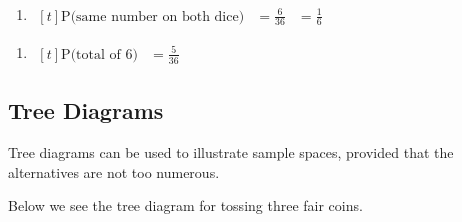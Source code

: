 \documentclass[11pt,a4paper]{book}
\begin{document}
\begin{example}
\begin{minipage}[t]{.6\textwidth}
\begin{enumerate}[label=(\alph*)]
\item
$
\begin{aligned}[t]
\text{P(same number on both dice)} & =\frac{6}{36} & =\frac{1}{6}
\end{aligned}
$
\end{enumerate}

\end{minipage}
\begin{minipage}[t]{.5\textwidth}

\begin{enumerate}[label=(\alph*),start=2]
\item
$
\begin{aligned}[t]
\text{P(total of 6)} & =\frac{5}{36}
\end{aligned}
$

\end{enumerate}

\end{minipage}

\end{example}


\subsection{Tree Diagrams}

Tree diagrams can be used to illustrate sample spaces, provided that
the alternatives are not too numerous.

Below we see the tree diagram for tossing three fair coins.
\end{document}
